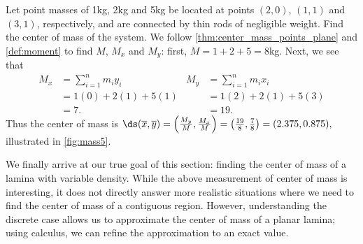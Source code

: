 \begin{example}\label{ex_mass5}%
Let point masses of 1kg, 2kg and 5kg be located at points $(2,0)$, $(1,1)$ and $(3,1)$, respectively, and are connected by thin rods of negligible weight. Find the center of mass of the system.
\solution
We follow \autoref{thm:center_mass_points_plane} and \autoref{def:moment} to find $M$, $M_x$ and $M_y$: first, $M = 1+2+5 = 8$kg.  Next, we see that
%
%
\begin{align*}
M_x &=  \sum_{i=1}^n m_iy_i & M_y &=  \sum_{i=1}^n m_i x_i \\
		&= 1(0) + 2(1) + 5(1) & &= 1(2) + 2(1) + 5(3) \\
		&= 7. & &= 19.
\end{align*}
Thus the center of mass is $\ds (\overline{x},\overline{y}) = \left(\frac{M_y}{M},\frac{M_x}M\right) = \left(\frac{{19}}8,\frac78\right)  =(2.375,0.875),$ illustrated in \autoref{fig:mass5}.
\end{example}

We finally arrive at our true goal of this section: finding the center of mass of a lamina with variable density. While the above measurement of center of mass is interesting, it does not directly answer more realistic situations where we need to find the center of mass of a contiguous region. However, understanding the discrete case allows us to approximate the center of mass of a planar lamina; using calculus, we can refine the approximation to an exact value.

